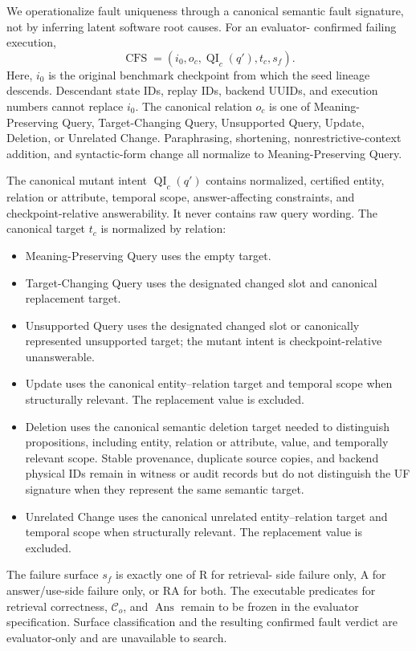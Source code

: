 We operationalize fault uniqueness through a canonical semantic fault
signature, not by inferring latent software root causes. For an evaluator-
confirmed failing execution,
\[
\operatorname{CFS}=
(i_0,o_c,\operatorname{QI}_c(q'),t_c,s_f).
\]
Here, \(i_0\) is the original benchmark checkpoint from which the seed lineage
descends. Descendant state IDs, replay IDs, backend UUIDs, and execution numbers
cannot replace \(i_0\). The canonical relation \(o_c\) is one of Meaning-
Preserving Query, Target-Changing Query, Unsupported Query, Update, Deletion,
or Unrelated Change. Paraphrasing, shortening, nonrestrictive-context addition,
and syntactic-form change all normalize to Meaning-Preserving Query.

The canonical mutant intent \(\operatorname{QI}_c(q')\) contains normalized,
certified entity, relation or attribute, temporal scope, answer-affecting
constraints, and checkpoint-relative answerability. It never contains raw
query wording. The canonical target \(t_c\) is normalized by relation:
\begin{itemize}
    \item Meaning-Preserving Query uses the empty target.
    \item Target-Changing Query uses the designated changed slot and canonical
    replacement target.
    \item Unsupported Query uses the designated changed slot or canonically
    represented unsupported target; the mutant intent is checkpoint-relative
    unanswerable.
    \item Update uses the canonical entity--relation target and temporal scope
    when structurally relevant. The replacement value is excluded.
    \item Deletion uses the canonical semantic deletion target needed to
    distinguish propositions, including entity, relation or attribute, value,
    and temporally relevant scope. Stable provenance, duplicate source copies,
    and backend physical IDs remain in witness or audit records but do not
    distinguish the UF signature when they represent the same semantic target.
    \item Unrelated Change uses the canonical unrelated entity--relation target
    and temporal scope when structurally relevant. The replacement value is
    excluded.
\end{itemize}

The failure surface \(s_f\) is exactly one of \(\mathrm{R}\) for retrieval-
side failure only, \(\mathrm{A}\) for answer/use-side failure only, or
\(\mathrm{RA}\) for both. The executable predicates for retrieval correctness,
\(\mathcal{C}_o\), and \(\operatorname{Ans}\) remain to be frozen in the
evaluator specification. Surface classification and the resulting confirmed
fault verdict are evaluator-only and are unavailable to search.

